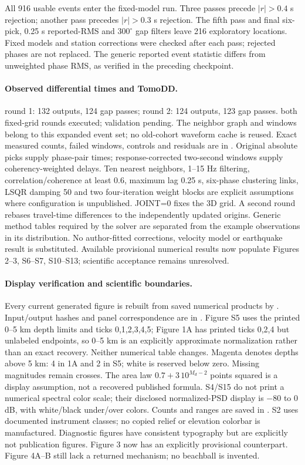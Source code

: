 All 916 usable events enter the fixed-model run. Three passes precede $|r|>0.4$ s rejection; another pass precedes $|r|>0.3$ s rejection. The fifth pass and final six-pick, 0.25 s reported-RMS and $300^\circ$ gap filters leave 216 exploratory locations. Fixed models and station corrections were checked after each pass; rejected phases are not replaced. The generic reported event statistic differs from unweighted phase RMS, as verified in the preceding checkpoint.

\paragraph{Observed differential times and TomoDD.}
round 1: 132 outputs, 124 gap passes; round 2: 124 outputs, 123 gap passes. both fixed-grid rounds executed; validation pending. The neighbor graph and windows belong to this expanded event set; no old-cohort waveform cache is reused. Exact measured counts, failed windows, controls and residuals are in . Original absolute picks supply phase-pair times; response-corrected two-second windows supply coherency-weighted delays. Ten nearest neighbors, 1--15 Hz filtering, correlation/coherence at least 0.6, maximum lag 0.25 s, six-phase clustering links, LSQR damping 50 and two four-iteration weight blocks are explicit assumptions where configuration is unpublished. JOINT=0 fixes the 3D grid. A second round rebases travel-time differences to the independently updated origins. Generic method tables required by the solver are separated from the example observations in its distribution. No author-fitted corrections, velocity model or earthquake result is substituted. Available provisional numerical results now populate Figures 2--3, S6--S7, S10--S13; scientific acceptance remains unresolved.

\paragraph{Display verification and scientific boundaries.}
Every current generated figure is rebuilt from saved numerical products by . Input/output hashes and panel correspondence are in . Figure S5 uses the printed 0--5 km depth limits and ticks 0,1,2,3,4,5; Figure 1A has printed ticks 0,2,4 but unlabeled endpoints, so 0--5 km is an explicitly approximate normalization rather than an exact recovery. Neither numerical table changes. Magenta denotes depths above 5 km: 4 in 1A and 2 in S5; white is reserved below zero. Missing magnitudes remain crosses. The area law $0.7+3\,10^{M_d-2}$ points squared is a display assumption, not a recovered published formula. S4/S15 do not print a numerical spectral color scale; their disclosed normalized-PSD display is $-80$ to 0 dB, with white/black under/over colors. Counts and ranges are saved in . S2 uses documented instrument classes; no copied relief or elevation colorbar is manufactured. Diagnostic figures have consistent typography but are explicitly not publication figures. Figure 3 now has an explicitly provisional counterpart. Figure 4A--B still lack a returned mechanism; no beachball is invented.

